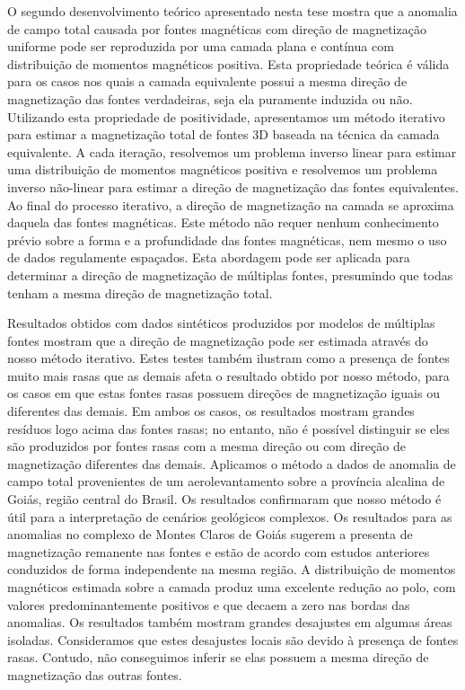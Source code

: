 O segundo desenvolvimento teórico apresentado nesta tese mostra que a anomalia de campo total causada por fontes magnéticas com direção 
de magnetização uniforme pode ser reproduzida por uma camada plana e contínua com distribuição de momentos magnéticos positiva. 
Esta propriedade teórica é válida para os casos nos quais a camada equivalente possui a mesma direção de magnetização 
das fontes verdadeiras, seja ela puramente induzida ou não. 
Utilizando esta propriedade de positividade, apresentamos um método iterativo para estimar a magnetização total de fontes 
3D baseada na técnica da camada equivalente. A cada iteração, resolvemos um problema inverso linear para estimar uma distribuição 
de momentos magnéticos positiva e resolvemos um problema inverso não-linear para estimar a direção de magnetização das 
fontes equivalentes. Ao final do processo iterativo, a direção de magnetização na camada se aproxima daquela das 
fontes magnéticas. 
Este método não requer nenhum conhecimento prévio sobre a forma e a profundidade das fontes 
magnéticas, nem mesmo o uso de dados regulamente espaçados. Esta abordagem pode ser aplicada para determinar a direção 
de magnetização de múltiplas fontes, presumindo que todas tenham a mesma direção de magnetização total. 

Resultados obtidos com dados sintéticos produzidos por modelos de múltiplas fontes mostram que a direção de magnetização 
pode ser estimada através do nosso método iterativo. 
Estes testes também ilustram como a presença de fontes muito mais rasas que as demais afeta o resultado obtido por nosso 
método, para os casos em que estas fontes rasas possuem direções de magnetização iguais ou diferentes das demais. 
Em ambos os casos, os resultados mostram grandes resíduos logo acima das fontes rasas; no entanto, não é possível 
distinguir se eles são produzidos por fontes rasas com a mesma direção ou com direção de magnetização diferentes das demais. 
Aplicamos o método a dados de anomalia de campo total provenientes de um aerolevantamento sobre a província alcalina de Goiás, 
região central do Brasil. 
Os resultados confirmaram que nosso método é útil para a interpretação de cenários geológicos complexos. 
Os resultados para as anomalias no complexo de Montes Claros de Goiás sugerem a presenta de magnetização remanente nas fontes e 
estão de acordo com estudos anteriores conduzidos de forma independente na mesma região. 
A distribuição de momentos magnéticos estimada sobre a camada produz uma excelente redução ao polo, com valores predominantemente positivos
e que decaem a zero nas bordas das anomalias. 
Os resultados também mostram grandes desajustes em algumas áreas isoladas. 
Consideramos que estes desajustes locais são devido à presença de fontes rasas. Contudo, não conseguimos inferir se elas possuem a 
mesma direção de magnetização das outras fontes. 


